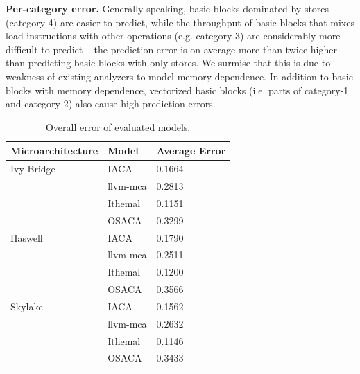 \textbf{Per-category error.} Generally speaking, basic blocks dominated by stores
(category-4) are easier to predict,
while the throughput of basic blocks that mixes load instructions
with other operations (e.g. category-3) are considerably
more difficult to predict -- the prediction error is on average more than
twice higher than predicting basic blocks with only stores. 
We surmise that this is due to weakness of existing analyzers to model 
memory dependence.
In addition to basic blocks with memory dependence,
vectorized basic blocks (i.e. parts of category-1 and category-2) also cause high prediction errors.
\fi



\begin{table}
\begin{tabular}{|p{}|p{}|p{}|}
\hline

\textbf{Microarchitecture} & \textbf{Model} & \textbf{Average Error}\\
\hline

Ivy Bridge & IACA & 0.1664\\
    & llvm-mca & 0.2813\\
    & Ithemal & 0.1151\\
    & OSACA & 0.3299\\
\hline

Haswell & IACA & 0.1790\\
    & llvm-mca & 0.2511\\
    & Ithemal & 0.1200\\
    & OSACA & 0.3566\\
    
\hline 
Skylake & IACA & 0.1562\\
    & llvm-mca & 0.2632\\
    & Ithemal & 0.1146\\
    & OSACA & 0.3433\\

\hline
\end{tabular}
\\
\caption{Overall error of evaluated models.}
\label{tab:overall}
\end{table}


